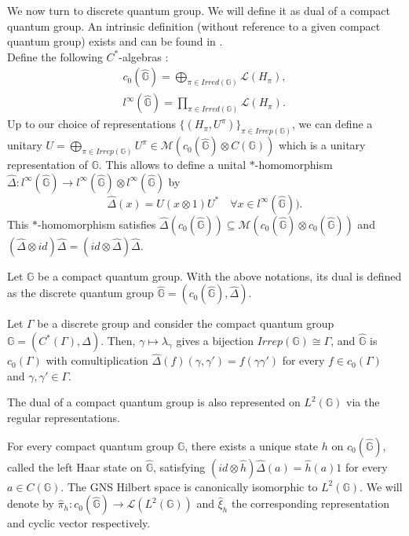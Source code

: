 We now turn to discrete quantum group. We will define it as dual of a compact quantum group. An intrinsic definition (without reference to a given compact quantum group) exists and can be found in \cite{vandaele}.\\

Define the following $C^*$-algebras :
\[\begin{array}{c}
c_0(\hat{\mathbb G})= \bigoplus_{\pi\in Irred(\mathbb G)} \mathcal L(H_\pi),\\
l^\infty(\hat{\mathbb G})= \prod_{\pi\in Irred(\mathbb G)} \mathcal L(H_\pi).
\end{array}\]
Up to our choice of representations $\{(H_\pi,U^\pi)\}_{\pi\in Irrep(\mathbb G)}$, we can define a unitary $U = \bigoplus_{\pi\in Irrep(\mathbb G)} U^\pi\in \mathcal M(c_0(\hat{\mathbb G}) \otimes C(\mathbb G))$ which is a unitary representation of $\mathbb G$. This allows to define a unital $*$-homomorphism $\hat \Delta : l^\infty(\hat{\mathbb G}) \rightarrow l^\infty(\hat{\mathbb G})\otimes l^\infty(\hat{\mathbb G})$ by 
\[\hat\Delta ( x) = U(x \otimes 1)U^*\quad \forall x\in l^\infty(\hat{\mathbb G})).\]
This $*$-homomorphism satisfies $\hat\Delta(c_0(\hat{\mathbb G}))\subseteq \mathcal M(c_0(\hat{\mathbb G})\otimes c_0(\hat{\mathbb G}))$ and $(\hat\Delta \otimes id) \hat\Delta = (id\otimes \hat\Delta)\hat\Delta$. %

\begin{definition}
Let $\mathbb G$ be a compact quantum group. With the above notations, its dual is defined as the discrete quantum group $\hat{\mathbb G} = (c_0(\hat{\mathbb G}),\hat\Delta)$.
\end{definition}

\begin{Expl} Let $\Gamma$ be a discrete group and consider the compact quantum group $\mathbb G=(C^*(\Gamma),\Delta)$. Then, $\gamma\mapsto \lambda_\gamma$ gives a bijection $Irrep(\mathbb G)\cong \Gamma$, and $\hat{\mathbb G}$ is $c_0(\Gamma)$ with comultiplication $\hat\Delta (f)(\gamma,\gamma') = f(\gamma\gamma')$ for every $f\in c_0(\Gamma)$ and $\gamma,\gamma'\in\Gamma$.
\end{Expl}

The dual of a compact quantum group is also represented on $L^2(\mathbb G)$ via the regular representations. 
\begin{prop}
For every compact quantum group $\mathbb G$, there exists a unique state $h$ on $c_0(\hat{\mathbb G})$, called the left Haar state on $\hat{\mathbb G}$, satisfying $(id\otimes \hat h)\hat\Delta(a) = \hat h(a)1 $ for every $a\in C(\mathbb G)$. The GNS Hilbert space is canonically isomorphic to $L^2(\mathbb G)$. We will denote by $\hat \pi_h : c_0(\hat{\mathbb G})\rightarrow \mathcal L(L^2(\mathbb G))$ and $\hat \xi_h$ the corresponding representation and cyclic vector respectively.  
\end{prop}

